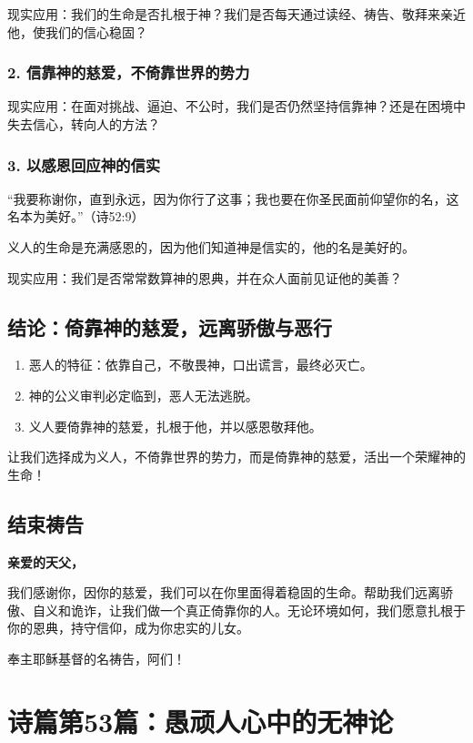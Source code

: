 \documentclass[a4paper, 12pt]{article}
\begin{document}
现实应用：我们的生命是否扎根于神？我们是否每天通过读经、祷告、敬拜来亲近他，使我们的信心稳固？
\subsubsection*{2. 信靠神的慈爱，不倚靠世界的势力}
\hspace{0.6cm}现实应用：在面对挑战、逼迫、不公时，我们是否仍然坚持信靠神？还是在困境中失去信心，转向人的方法？
\subsubsection*{3. 以感恩回应神的信实}
“我要称谢你，直到永远，因为你行了这事；我也要在你圣民面前仰望你的名，这名本为美好。”（诗52:9）

义人的生命是充满感恩的，因为他们知道神是信实的，他的名是美好的。

现实应用：我们是否常常数算神的恩典，并在众人面前见证他的美善？
\subsection*{结论：倚靠神的慈爱，远离骄傲与恶行}
\begin{enumerate}
    \item 恶人的特征：依靠自己，不敬畏神，口出谎言，最终必灭亡。

    \item 神的公义审判必定临到，恶人无法逃脱。

    \item 义人要倚靠神的慈爱，扎根于他，并以感恩敬拜他。

\end{enumerate}

让我们选择成为义人，不倚靠世界的势力，而是倚靠神的慈爱，活出一个荣耀神的生命！

\subsection*{结束祷告}
\textbf{亲爱的天父，}

我们感谢你，因你的慈爱，我们可以在你里面得着稳固的生命。帮助我们远离骄傲、自义和诡诈，让我们做一个真正倚靠你的人。无论环境如何，我们愿意扎根于你的恩典，持守信仰，成为你忠实的儿女。

奉主耶稣基督的名祷告，阿们！
\newpage
\section{诗篇第53篇：愚顽人心中的无神论}
\end{document}
